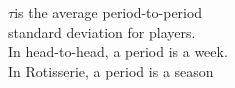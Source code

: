 \documentclass[preview]{standalone}
\begin{document}
\begin{center}
$ \tau$is the average period-to-period \\ standard deviation for players. \\In head-to-head, a period is a week. \\In Rotisserie, a period is a season
\end{center}
\end{document}
